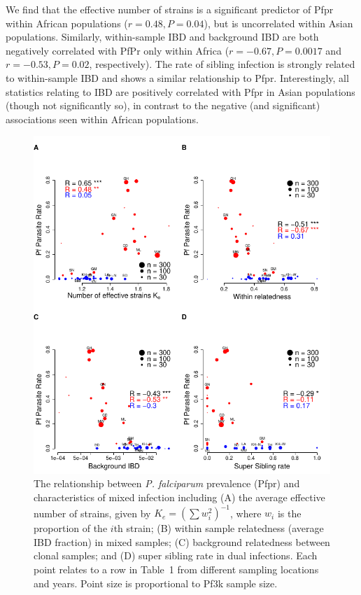 \documentclass[9pt,lineno]{elife}
\begin{document}
We find that the effective number of strains is a significant predictor of Pfpr within African populations ($r=0.48, P=0.04$), but is uncorrelated within Asian populations. Similarly, within-sample IBD and background IBD are both negatively correlated with PfPr only within Africa ($r= -0.67, P=0.0017$ and $r = -0.53, P=0.02$, respectively).  The rate of sibling infection is strongly related to within-sample IBD and shows a similar relationship to Pfpr.  Interestingly, all statistics relating to IBD are positively correlated with Pfpr in Asian populations (though not significantly so), in contrast to the negative (and significant) associations seen within African populations.



\begin{figure}[ht]
  \centering{}
  \includegraphics[width=\textwidth]{Fig5.pdf}
  \caption{The relationship between {\it P. falciparum} prevalence (Pfpr) and characteristics of mixed infection including (A) the average effective number of strains, given by $K_e = (\sum w_i^2)^{-1}$, where $w_i$ is the proportion of the $i$th strain; (B) within sample relatedness (average IBD fraction) in mixed samples; (C) background relatedness between clonal samples; and (D) super sibling rate in dual infections. Each point relates to a row in Table~1 from different sampling locations and years. Point size is proportional to Pf3k sample size. }
  \label{fig:model}
\end{figure}
\end{document}
